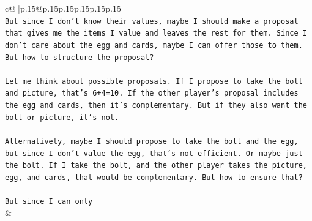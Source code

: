 \documentclass{article}
\begin{document}
{\begin{supertabular}{c@{$\;$}|p{.15\linewidth}@{}p{.15\linewidth}p{.15\linewidth}p{.15\linewidth}p{.15\linewidth}p{.15\linewidth}}
{{{\\ 
\texttt{But since I don't know their values, maybe I should make a proposal that gives me the items I value and leaves the rest for them. Since I don't care about the egg and cards, maybe I can offer those to them. But how to structure the proposal?} \\
\\ 
\texttt{Let me think about possible proposals. If I propose to take the bolt and picture, that's 6+4=10. If the other player's proposal includes the egg and cards, then it's complementary. But if they also want the bolt or picture, it's not. } \\
\\ 
\texttt{Alternatively, maybe I should propose to take the bolt and the egg, but since I don't value the egg, that's not efficient. Or maybe just the bolt. If I take the bolt, and the other player takes the picture, egg, and cards, that would be complementary. But how to ensure that?} \\
\\ 
\texttt{But since I can only} \\
            }
        }
    }
    & \\ \\


\end{supertabular}}
\end{document}
